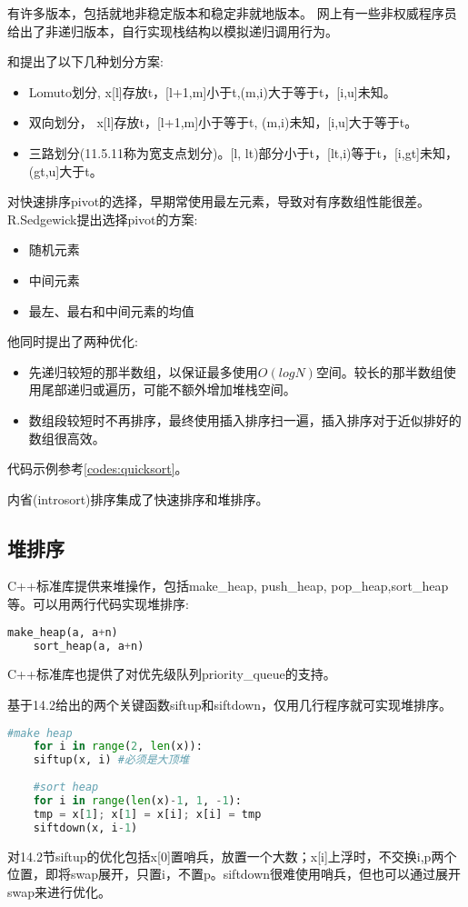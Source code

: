 有许多版本，包括就地非稳定版本和稳定非就地版本。
网上有一些非权威程序员给出了非递归版本，自行实现栈结构以模拟递归调用行为。

\cite{pp}和\cite{sedgewick}提出了以下几种划分方案:
\begin{itemize}
    \item 
	Lomuto划分, x[l]存放t，[l+1,m]小于t,(m,i)大于等于t，[i,u]未知。
    \item 
	双向划分， x[l]存放t，[l+1,m]小于等于t, (m,i)未知，[i,u]大于等于t。
    \item 
	三路划分(\cite{pp}11.5.11称为宽支点划分)。[l, lt)部分小于t，[lt,i)等于t，[i,gt]未知，(gt,u]大于t。
\end{itemize}


对快速排序pivot的选择，早期常使用最左元素，导致对有序数组性能很差。R.Sedgewick提出\cite{wikipedia}选择pivot的方案:
\begin{itemize}
    \item 随机元素
    \item 中间元素
    \item 最左、最右和中间元素的均值
\end{itemize}

他同时提出了两种优化:
\begin{itemize}
    \item 先递归较短的那半数组，以保证最多使用$O(logN)$空间。较长的那半数组使用尾部递归或遍历，可能不额外增加堆栈空间。
    \item 数组段较短时不再排序，最终使用插入排序扫一遍，插入排序对于近似排好的数组很高效。
\end{itemize}

代码示例参考\ref{codes:quicksort}。

内省(introsort)排序集成了快速排序和堆排序。

\subsection{堆排序}

C++标准库提供来堆操作，包括make\_heap, push\_heap, pop\_heap,sort\_heap等。可以用两行代码实现堆排序:
\begin{lstlisting}[language=Python]
    make_heap(a, a+n)
    sort_heap(a, a+n)
\end{lstlisting}

C++标准库也提供了对优先级队列priority\_queue的支持。

基于\cite{pp}14.2给出的两个关键函数siftup和siftdown，仅用几行程序就可实现堆排序。
\begin{lstlisting}[language=Python]
    #make heap
    for i in range(2, len(x)):
	siftup(x, i) #必须是大顶堆
    
    #sort heap
    for i in range(len(x)-1, 1, -1):
	tmp = x[1]; x[1] = x[i]; x[i] = tmp
	siftdown(x, i-1)
\end{lstlisting}
对\cite{pp}14.2节siftup的优化包括x[0]置哨兵，放置一个大数；x[i]上浮时，不交换i,p两个位置，即将swap展开，只置i，不置p。siftdown很难使用哨兵，但也可以通过展开swap来进行优化。


